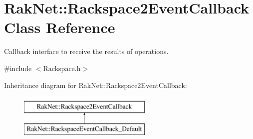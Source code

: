 \hypertarget{class_rak_net_1_1_rackspace2_event_callback}{\section{Rak\-Net\-:\-:Rackspace2\-Event\-Callback Class Reference}
\label{class_rak_net_1_1_rackspace2_event_callback}
}


Callback interface to receive the results of operations.  




{\ttfamily \#include $<$Rackspace.\-h$>$}

Inheritance diagram for Rak\-Net\-:\-:Rackspace2\-Event\-Callback\-:\begin{figure}[H]
\begin{center}
\leavevmode
\includegraphics[height=2.000000cm]{class_rak_net_1_1_rackspace2_event_callback}
\end{center}
\end{figure}
